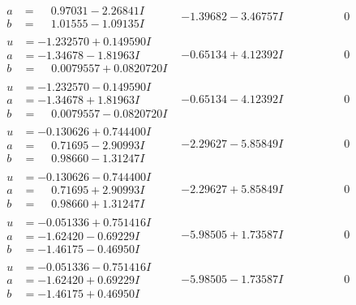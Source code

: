 \documentclass[1p]{elsarticle_modified}
\theoremstyle{definition}
\begin{document}
$$\begin{array}{c|c|c}
\begin{aligned}
a &= \phantom{-}0.97031 - 2.26841 I \\
b &= \phantom{-}1.01555 - 1.09135 I\end{aligned}
 & -1.39682 - 3.46757 I & \phantom{-0.000000 } 0 \\ \hline\begin{aligned}
u &= -1.232570 + 0.149590 I \\
a &= -1.34678 - 1.81963 I \\
b &= \phantom{-}0.0079557 + 0.0820720 I\end{aligned}
 & -0.65134 + 4.12392 I & \phantom{-0.000000 } 0 \\ \hline\begin{aligned}
u &= -1.232570 - 0.149590 I \\
a &= -1.34678 + 1.81963 I \\
b &= \phantom{-}0.0079557 - 0.0820720 I\end{aligned}
 & -0.65134 - 4.12392 I & \phantom{-0.000000 } 0 \\ \hline\begin{aligned}
u &= -0.130626 + 0.744400 I \\
a &= \phantom{-}0.71695 - 2.90993 I \\
b &= \phantom{-}0.98660 - 1.31247 I\end{aligned}
 & -2.29627 - 5.85849 I & \phantom{-0.000000 } 0 \\ \hline\begin{aligned}
u &= -0.130626 - 0.744400 I \\
a &= \phantom{-}0.71695 + 2.90993 I \\
b &= \phantom{-}0.98660 + 1.31247 I\end{aligned}
 & -2.29627 + 5.85849 I & \phantom{-0.000000 } 0 \\ \hline\begin{aligned}
u &= -0.051336 + 0.751416 I \\
a &= -1.62420 - 0.69229 I \\
b &= -1.46175 - 0.46950 I\end{aligned}
 & -5.98505 + 1.73587 I & \phantom{-0.000000 } 0 \\ \hline\begin{aligned}
u &= -0.051336 - 0.751416 I \\
a &= -1.62420 + 0.69229 I \\
b &= -1.46175 + 0.46950 I\end{aligned}
 & -5.98505 - 1.73587 I & \phantom{-0.000000 } 0 \\ \hline\begin{aligned}

\end{aligned}
\end{array}$$
\end{document}
